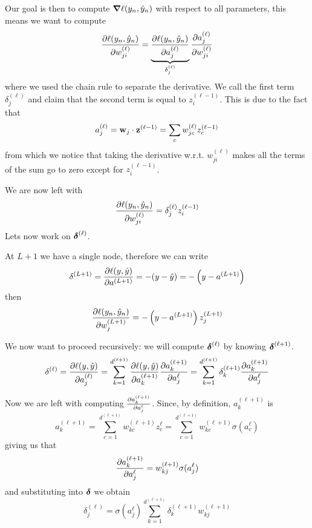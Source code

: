 \documentclass[12pt]{extarticle}
\renewcommand{\vec}[1]{\bvec{#1}}
\begin{document}
Our goal is then to compute $\grad \ell (y_n, \hat y_n)$ with respect to all parameters, this
means we want to compute
\begin{equation}
	\pdv{\ell(y_n, \hat y_n)}{w_{ji}^{(\ell)}} =
	\underbrace{\pdv{\ell(y_n, \hat y_n)}{a_{j}^{(\ell)}}}_{\delta^{(\ell)}_j}
	\pdv{a_{j}^{(\ell)}}{w_{ji}^{(\ell)}}
\end{equation}
where we used the chain rule to separate the derivative. We call the first term $\delta^{(\ell)}_j$
and claim that the second term is equal to $z_i^{(\ell - 1)}$. This is due to the fact that
\begin{equation}
	a^{(\ell)}_j = \vec w_j \cdot \vec z^{(\ell -1)} = \sum_c w_{jc}^{(\ell)} z_c^{(\ell - 1)}
\end{equation}
from which we notice that taking the derivative w.r.t. $w^{(\ell)}_{ji}$ makes all the terms of the
sum go to zero except for $z_i^{(\ell - 1)}$.

We are now left with
\begin{equation}
	\pdv{\ell(y_n, \hat y_n)}{w_{ji}^{(\ell)}} = \delta^{(\ell)}_j z_i^{(\ell - 1)}
\end{equation}
Lets now work on $\vec \delta^{(\ell)}$.

At $L + 1$ we have a single node, therefore we can write
\begin{equation}
	\delta^{(L + 1)} = \pdv{\ell(y, \hat y)}{a^{(L+1)}} =  -(y- \hat y) = -\left(y - a^{(L+1)}\right)
\end{equation}
then
\begin{equation}
	\pdv{\ell(y_n, \hat y_n)}{w_{j}^{(L+1)}} =-\left(y - a^{(L+1)}\right) z_j^{(L+1)}
\end{equation}

We now want to proceed recursively: we will compute $\vec \delta^{(\ell)}$ by knowing
$\vec \delta^{(\ell + 1)}$.
\begin{equation}
	\delta^{(\ell)} = \pdv{\ell(y, \hat y)}{a_j^{(\ell)}}
	= \sum_{k = 1}^{d^{(\ell + 1)}} \pdv{\ell(y, \hat y)}{a_k^{(\ell+1)}}\pdv{a_k^{(\ell + 1)}}{a_j^{\ell}}
	= \sum_{k = 1}^{d^{(\ell + 1)}} \delta^{(\ell + 1)}_k \pdv{a_k^{(\ell + 1)}}{a_j^{\ell}}
\end{equation}

Now we are left with computing $\pdv{a_k^{(\ell + 1)}}{a_j^{\ell}}$. Since, by definition,
$a_k^{(\ell + 1)}$ is
\begin{equation}
	a_k^{(\ell + 1)} = \sum^{d^{(\ell + 1)}}_{c = 1} w_{kc}^{(\ell + 1)} z_c^{\ell}
	= \sum^{d^{(\ell + 1)}}_{c = 1} w_{kc}^{(\ell + 1)} \sigma(a_c^{\ell})
\end{equation}
giving us that
\begin{equation}
	\pdv{a_k^{(\ell + 1)}}{a_j^{\ell}} = w_{kj}^{(\ell + 1)} \sigma(a_j^{\ell})
\end{equation}
and substituting into $\vec \delta$ we obtain
\begin{equation}
	\delta^{(\ell)}_j = \sigma(a_j^{\ell}) \sum_{k = 1}^{d^{(\ell + 1)}}
	\delta_k^{(\ell + 1)} w_{kj}^{(\ell + 1)}
\end{equation}
\end{document}
